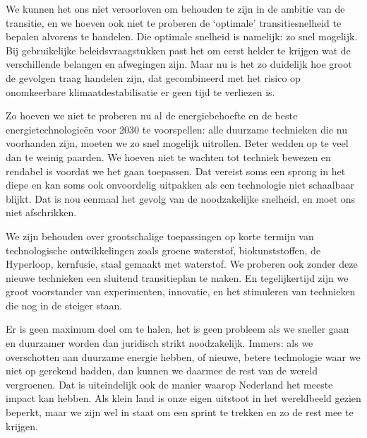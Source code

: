 
We kunnen het ons niet veroorloven om behouden te zijn in de ambitie van de transitie, en we hoeven ook niet te proberen de ‘optimale’ transitiesnelheid te bepalen alvorens te handelen. Die optimale snelheid is namelijk: zo snel mogelijk. Bij gebruikelijke beleidsvraagstukken past het om eerst helder te krijgen wat de verschillende belangen en afwegingen zijn. Maar nu is het zo duidelijk hoe groot de gevolgen traag handelen zijn, dat gecombineerd met het risico op onomkeerbare klimaatdestabilisatie er geen tijd te verliezen is.

Zo hoeven we niet te proberen nu al de energiebehoefte en de beste energietechnologieën voor 2030 te voorspellen: alle duurzame technieken die nu voorhanden zijn, moeten we zo snel mogelijk uitrollen. Beter wedden op te veel dan te weinig paarden. We hoeven niet te wachten tot techniek bewezen en rendabel is voordat we het gaan toepassen. Dat vereist soms een sprong in het diepe en kan soms ook onvoordelig uitpakken als een technologie niet schaalbaar blijkt. Dat is nou eenmaal het gevolg van de noodzakelijke snelheid, en moet ons niet afschrikken.

We zijn behouden over grootschalige toepassingen op korte termijn van technologische ontwikkelingen zoals groene waterstof, biokunststoffen, de Hyperloop, kernfusie, staal gemaakt met waterstof. We proberen ook zonder deze nieuwe technieken een sluitend transitieplan te maken. En tegelijkertijd zijn we groot voorstander van experimenten, innovatie, en het stimuleren van technieken die nog in de steiger staan.

Er is geen maximum doel om te halen, het is geen probleem als we sneller gaan en duurzamer worden dan juridisch strikt noodzakelijk. Immers: als we overschotten aan duurzame energie hebben, of nieuwe, betere technologie waar we niet op gerekend hadden, dan kunnen we daarmee de rest van de wereld vergroenen. Dat is uiteindelijk ook de manier waarop Nederland het meeste impact kan hebben. Als klein land is onze eigen uitstoot in het wereldbeeld gezien beperkt, maar we zijn wel in staat om een sprint te trekken en zo de rest mee te krijgen.
